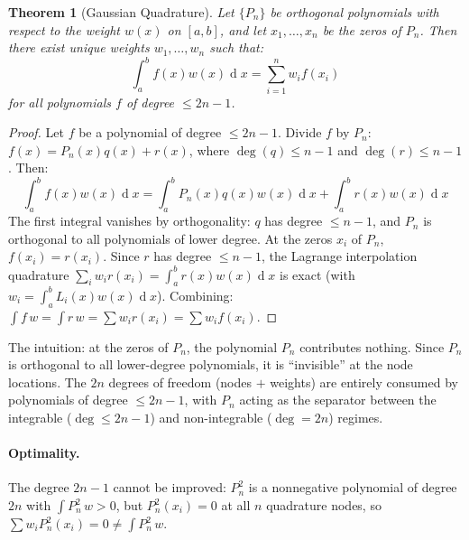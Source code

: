 \documentclass[12pt,a4paper]{report}
\DeclareMathOperator{\deriv}{d}
\theoremstyle{thms}
\newtheorem{theorem}{Theorem}[section]
\theoremstyle{defns}
\begin{document}
\begin{theorem}[Gaussian Quadrature]
    Let $\{P_n\}$ be orthogonal polynomials with respect to the weight $w(x)$ on $[a, b]$, and let $x_1, \ldots, x_n$ be the zeros of $P_n$. Then there exist unique weights $w_1, \ldots, w_n$ such that:
    \begin{equation}
        \int_a^b f(x)w(x)\deriv{x} = \sum_{i=1}^{n} w_i f(x_i)
    \end{equation}
    for all polynomials $f$ of degree $\leq 2n - 1$.
    \label{thm:gauss_quad}
\end{theorem}

\begin{proof}
    Let $f$ be a polynomial of degree $\leq 2n - 1$. Divide $f$ by $P_n$: $f(x) = P_n(x)q(x) + r(x)$, where $\deg(q) \leq n - 1$ and $\deg(r) \leq n - 1$. Then:
    \begin{equation}
        \int_a^b f(x)w(x)\deriv{x} = \int_a^b P_n(x)q(x)w(x)\deriv{x} + \int_a^b r(x)w(x)\deriv{x}
    \end{equation}
    The first integral vanishes by orthogonality: $q$ has degree $\leq n - 1$, and $P_n$ is orthogonal to all polynomials of lower degree. At the zeros $x_i$ of $P_n$, $f(x_i) = r(x_i)$. Since $r$ has degree $\leq n - 1$, the Lagrange interpolation quadrature $\sum_i w_i r(x_i) = \int_a^b r(x)w(x)\deriv{x}$ is exact (with $w_i = \int_a^b L_i(x)w(x)\deriv{x}$). Combining: $\int f\,w = \int r\,w = \sum w_i r(x_i) = \sum w_i f(x_i)$.
\end{proof}

The intuition: at the zeros of $P_n$, the polynomial $P_n$ contributes nothing. Since $P_n$ is orthogonal to all lower-degree polynomials, it is ``invisible'' at the node locations. The $2n$ degrees of freedom (nodes $+$ weights) are entirely consumed by polynomials of degree $\leq 2n - 1$, with $P_n$ acting as the separator between the integrable ($\deg \leq 2n-1$) and non-integrable ($\deg = 2n$) regimes.

\paragraph{Optimality.} The degree $2n - 1$ cannot be improved: $P_n^2$ is a nonnegative polynomial of degree $2n$ with $\int P_n^2\,w > 0$, but $P_n^2(x_i) = 0$ at all $n$ quadrature nodes, so $\sum w_i P_n^2(x_i) = 0 \neq \int P_n^2\,w$.
\end{document}
